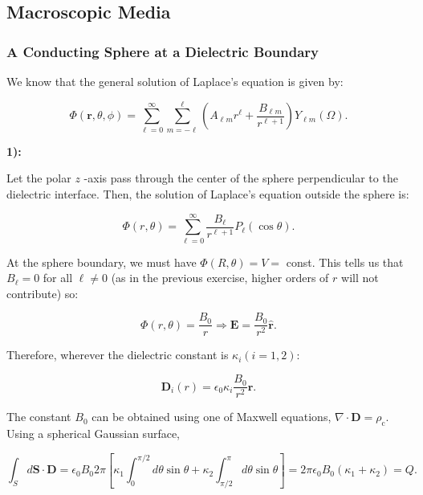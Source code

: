 \subsection{Macroscopic Media}


\subsubsection{A Conducting Sphere at a Dielectric Boundary}\label{A Conducting Sphere at a Dielectric Boundary}

We know that the general solution of Laplace's equation is given by:

\begin{equation}
	\Phi(\mathbf{r},\theta, \phi)=\sum_{\ell=0}^{\infty} \sum_{m=-\ell}^{\ell}\left( A_{\ell m} r^{\ell}  + \frac{B_{\ell m}}{r^{\ell+1}} \right) Y_{\ell m}(\Omega).
\end{equation}

\textbf{1):}

Let the polar $z$ -axis pass through the center of the sphere perpendicular to the dielectric interface. Then, the solution of Laplace's equation outside the sphere is:

\begin{equation}
	\Phi(r, \theta)=\sum_{\ell=0}^{\infty} \frac{B_{\ell}}{r^{\ell+1}} P_{\ell}(\cos \theta).
\end{equation}

At the sphere boundary, we must have $\Phi(R, \theta)= V =$ const. This tells us that $B_{\ell}=0$ for all $\ell \neq 0$ (as in the previous exercise, higher orders of $r$ will not contribute) so:
	
\begin{equation}
	\Phi(r, \theta)=\frac{B_{0}}{r} \Rightarrow \mathbf{E}=\frac{B_{0}}{r^{2}} \hat{\mathbf{r}} .
\end{equation}

Therefore, wherever the dielectric constant is $\kappa_{i}(i=1,2)$:

\begin{equation}
	\mathbf{D}_{i}(r)=\epsilon_{0} \kappa_{i} \frac{B_{0}}{r^{2}} \hat{\mathbf{r}}.
\end{equation}

The constant $B_{0}$ can be obtained using one of Maxwell equations, $\nabla \cdot \mathbf{D}=\rho_{\mathrm{c}} .$ Using a spherical Gaussian surface,

\begin{equation}
	\int_{S} d \mathbf{S} \cdot \mathbf{D}=\epsilon_{0} B_{0} 2 \pi\left[\kappa_{1} \int_{0}^{\pi / 2} d \theta \sin \theta+\kappa_{2} \int_{\pi / 2}^{\pi} d \theta \sin \theta\right]=2 \pi \epsilon_{0} B_{0}\left(\kappa_{1}+\kappa_{2}\right)=Q.
\end{equation}

